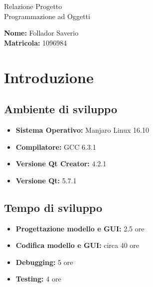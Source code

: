 \documentclass[a4paper,10pt] {article}
\begin{document}
\begin{center}

\begin{Huge} Relazione Progetto \\ Programmazione ad Oggetti \end{Huge}

\vfill

\begin{Large} \textbf{Nome:} Follador Saverio \\ \textbf{Matricola:} 1096984 
\end{Large}

\end{center}

\newpage

\tableofcontents

\newpage

\section{Introduzione}

\subsection{Ambiente di sviluppo}
\begin{itemize}
	\item \textbf{Sistema Operativo:} Manjaro Linux 16.10
	\item \textbf{Compilatore:} GCC 6.3.1
	\item \textbf{Versione Qt Creator:} 4.2.1
	\item \textbf{Versione Qt:} 5.7.1
\end{itemize}

\subsection{Tempo di sviluppo}
\begin{itemize}
	\item \textbf{Progettazione modello e GUI:} 2.5 ore
	\item \textbf{Codifica modello e GUI:} circa 40 ore
	\item \textbf{Debugging:} 5 ore
	\item \textbf{Testing:} 4 ore
\end{itemize}
\end{document}
